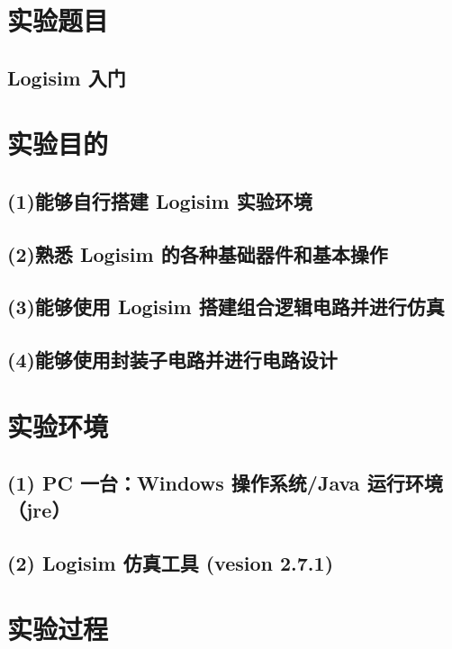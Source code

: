\documentclass{article}
\begin{document}
    \section{实验题目}
        \subsection*{\qquad Logisim 入门}

    \section{实验目的}
        \subsection*{\qquad (1)能够自行搭建 Logisim 实验环境}
        \subsection*{\qquad (2)熟悉 Logisim 的各种基础器件和基本操作}
        \subsection*{\qquad (3)能够使用 Logisim 搭建组合逻辑电路并进行仿真}
        \subsection*{\qquad (4)能够使用封装子电路并进行电路设计}
    
    \section{实验环境}
        \subsection*{\qquad (1) PC 一台：Windows 操作系统/Java 运行环境（jre）}
        \subsection*{\qquad (2) Logisim 仿真工具 (vesion 2.7.1)}
    
    \section{实验过程}
\end{document}
